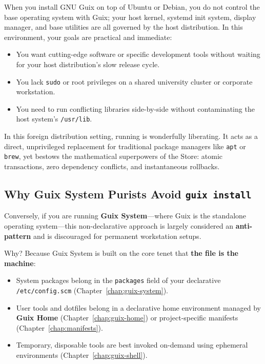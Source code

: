 When you install GNU Guix on top of Ubuntu or Debian, you do not control the base operating system with Guix; your host kernel, systemd init system, display manager, and base utilities are all governed by the host distribution. In this environment, your goals are practical and immediate:
\begin{itemize}
  \item You want cutting-edge software or specific development tools without waiting for your host distribution's slow release cycle.
  \item You lack \texttt{sudo} or root privileges on a shared university cluster or corporate workstation.
  \item You need to run conflicting libraries side-by-side without contaminating the host system's \texttt{/usr/lib}.
\end{itemize}

In this foreign distribution setting, running  is wonderfully liberating. It acts as a direct, unprivileged replacement for traditional package managers like \texttt{apt} or \texttt{brew}, yet bestows the mathematical superpowers of the Store: atomic transactions, zero dependency conflicts, and instantaneous rollbacks.

\subsection{Why Guix System Purists Avoid \texttt{guix install}}

Conversely, if you are running \textbf{Guix System}---where Guix is the standalone operating system---this non-declarative approach is largely considered an \textbf{anti-pattern} and is discouraged for permanent workstation setups.

Why? Because Guix System is built on the core tenet that \textbf{the file is the machine}:
\begin{itemize}
  \item System packages belong in the \texttt{packages} field of your declarative \texttt{/etc/config.scm} (Chapter~\ref{chap:guix-system}).
  \item User tools and dotfiles belong in a declarative home environment managed by \textbf{Guix Home} (Chapter~\ref{chap:guix-home}) or project-specific manifests (Chapter~\ref{chap:manifests}).
  \item Temporary, disposable tools are best invoked on-demand using ephemeral  environments (Chapter~\ref{chap:guix-shell}).
\end{itemize}

